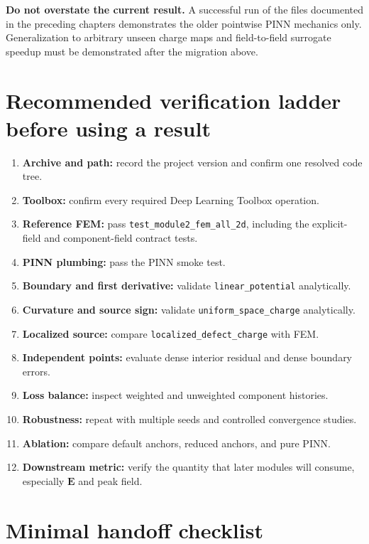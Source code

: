 \documentclass[11pt]{article}
\newcommand{\Evec}{\ensuremath{\mathbf{E}}}
\begin{document}
\begin{notebox}
\textbf{Do not overstate the current result.} A successful run of the files documented in the preceding chapters demonstrates the older pointwise PINN mechanics only. Generalization to arbitrary unseen charge maps and field-to-field surrogate speedup must be demonstrated after the migration above.
\end{notebox}

\section{Recommended verification ladder before using a result}

\begin{enumerate}[leftmargin=*]
  \item \textbf{Archive and path:} record the project version and confirm one resolved code tree.
  \item \textbf{Toolbox:} confirm every required Deep Learning Toolbox operation.
  \item \textbf{Reference FEM:} pass \texttt{test\_module2\_fem\_all\_2d}, including the explicit-field and component-field contract tests.
  \item \textbf{PINN plumbing:} pass the PINN smoke test.
  \item \textbf{Boundary and first derivative:} validate \texttt{linear\_potential} analytically.
  \item \textbf{Curvature and source sign:} validate \texttt{uniform\_space\_charge} analytically.
  \item \textbf{Localized source:} compare \texttt{localized\_defect\_charge} with FEM.
  \item \textbf{Independent points:} evaluate dense interior residual and dense boundary errors.
  \item \textbf{Loss balance:} inspect weighted and unweighted component histories.
  \item \textbf{Robustness:} repeat with multiple seeds and controlled convergence studies.
  \item \textbf{Ablation:} compare default anchors, reduced anchors, and pure PINN.
  \item \textbf{Downstream metric:} verify the quantity that later modules will consume, especially $\Evec$ and peak field.
\end{enumerate}

\section{Minimal handoff checklist}
\end{document}
